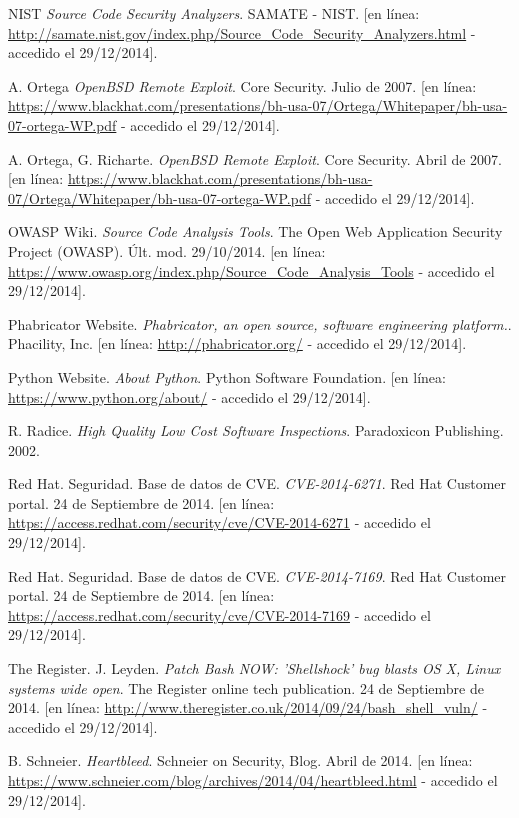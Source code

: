 \documentclass{beamer}
\begin{document}
\begin{thebibliography}{99}
	NIST
	\emph{Source Code Security Analyzers}.
	SAMATE - NIST.
	[en línea: \url{http://samate.nist.gov/index.php/Source_Code_Security_Analyzers.html} - accedido el 29/12/2014].
	
	A. Ortega
	\emph{OpenBSD Remote Exploit}.
	Core Security. 
	Julio de 2007. 
	[en línea: \url{https://www.blackhat.com/presentations/bh-usa-07/Ortega/Whitepaper/bh-usa-07-ortega-WP.pdf} - accedido el 29/12/2014].
	
	A. Ortega, G. Richarte.
	\emph{OpenBSD Remote Exploit}.
	Core Security. 
	Abril de 2007. 
	[en línea: \url{https://www.blackhat.com/presentations/bh-usa-07/Ortega/Whitepaper/bh-usa-07-ortega-WP.pdf} - accedido el 29/12/2014].
	
	OWASP Wiki.
	\emph{Source Code Analysis Tools}.
	The Open Web Application Security Project (OWASP).
	Últ. mod. 29/10/2014. 
	[en línea: \url{https://www.owasp.org/index.php/Source_Code_Analysis_Tools} - accedido el 29/12/2014].
	
	Phabricator Website.
	\emph{Phabricator, an open source, software engineering platform.}.
	Phacility, Inc.
	[en línea: \url{http://phabricator.org/} - accedido el 29/12/2014].
	
	Python Website.
	\emph{About Python}.
	Python Software Foundation.
	[en línea: \url{https://www.python.org/about/} - accedido el 29/12/2014].
	
	R. Radice.
	\emph{High Quality Low Cost Software Inspections}.
	Paradoxicon Publishing.
	2002.
	
	Red Hat. Seguridad. Base de datos de CVE.
	\emph{CVE-2014-6271}.
	Red Hat Customer portal.
	24 de Septiembre de 2014.
	[en línea: \url{https://access.redhat.com/security/cve/CVE-2014-6271} - accedido el 29/12/2014].
	
	Red Hat. Seguridad. Base de datos de CVE.
	\emph{CVE-2014-7169}.
	Red Hat Customer portal.
	24 de Septiembre de 2014.
	[en línea: \url{https://access.redhat.com/security/cve/CVE-2014-7169} - accedido el 29/12/2014].
	
	The Register. J. Leyden.
	\emph{Patch Bash NOW: 'Shellshock' bug blasts OS X, Linux systems wide open}.
	The Register online tech publication.
	24 de Septiembre de 2014.
	[en línea: \url{http://www.theregister.co.uk/2014/09/24/bash_shell_vuln/} - accedido el 29/12/2014].
	
	B. Schneier.
	\emph{Heartbleed}.
	Schneier on Security, Blog.
	Abril de 2014.
	[en línea: \url{https://www.schneier.com/blog/archives/2014/04/heartbleed.html} - accedido el 29/12/2014].
	

\end{thebibliography}
\end{document}
